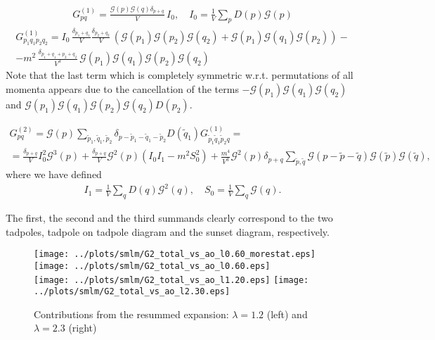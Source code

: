 \documentclass[twocolumn,showpacs,preprintnumbers,superscriptaddress,amsmath,floatfix,amssymb,secnumarabic]{revtex4}
\newcommand{\lr}[1]{ \left( #1 \right) }
\begin{document}
\begin{widetext}
\begin{eqnarray}
\label{G2_1}
 G^{\lr{1}}_{pq} = \frac{\mathcal{G}\lr{p} \mathcal{G}\lr{q} \delta_{p+q}}{V} \, I_0 ,
 \quad
 I_0 = \frac{1}{V} \sum\limits_p D\lr{p} \mathcal{G}\lr{p}
\end{eqnarray}
\begin{eqnarray}
\label{G4_1}
 G^{\lr{1}}_{p_1 q_1 p_2 q_2}
 =
 I_0 \,
 \frac{\delta_{p_1 + q_1}}{V}
 \frac{\delta_{p_2 + q_2}}{V} \,
 \lr{
  \mathcal{G}\lr{p_1} \mathcal{G}\lr{p_2} \mathcal{G}\lr{q_2}
  +
  \mathcal{G}\lr{p_1} \mathcal{G}\lr{q_1} \mathcal{G}\lr{p_2}
 }
 - \nonumber \\ -
 m^2 \,
 \frac{\delta_{p_1 + q_1 + p_2 + q_2}}{V^3} \,
 \mathcal{G}\lr{p_1} \mathcal{G}\lr{q_1} \mathcal{G}\lr{p_2} \mathcal{G}\lr{q_2}
\end{eqnarray}
Note that the last term which is completely symmetric w.r.t. permutations of all momenta appears
due to the cancellation of the terms $-\mathcal{G}\lr{p_1} \mathcal{G}\lr{q_1} \mathcal{G}\lr{q_2}$ and $\mathcal{G}\lr{p_1} \mathcal{G}\lr{q_1} \mathcal{G}\lr{p_2} \mathcal{G}\lr{q_2} D\lr{p_2}$.

\begin{eqnarray}
\label{G2_2}
 G^{\lr{2}}_{pq}
 =
 \mathcal{G}\lr{p}
 \sum\limits_{\tilde{p}_1, \tilde{q}_1, \tilde{p}_2 }
 \delta_{p - \tilde{p}_1 - \tilde{q}_1 - \tilde{p}_2}
 D\lr{\tilde{q}_1}
 G^{\lr{1}}_{\tilde{p}_1 \tilde{q}_1 \tilde{p}_2 q}
 = \nonumber \\ =
 \frac{\delta_{p+q}}{V} I_0^2 \mathcal{G}^3\lr{p}
 +
 \frac{\delta_{p+q}}{V} \mathcal{G}^2\lr{p} \lr{I_0 I_1 - m^2 S_0^2}
 +
 \frac{m^4}{V^3} \mathcal{G}^2\lr{p} \delta_{p+q}
 \sum\limits_{\tilde{p}, \tilde{q}}
 \mathcal{G}\lr{p - \tilde{p} - \tilde{q}}
 \mathcal{G}\lr{\tilde{p}}
 \mathcal{G}\lr{\tilde{q}} ,
\end{eqnarray}
where we have defined
\begin{eqnarray}
\label{scalar_ints_def}
 I_1 = \frac{1}{V} \sum\limits_q D\lr{q} \mathcal{G}^2\lr{q},
 \quad
 S_0 = \frac{1}{V} \sum\limits_q \mathcal{G}\lr{q} .
\end{eqnarray}

The first, the second and the third summands clearly correspond to the two tadpoles, tadpole on tadpole diagram and the sunset diagram, respectively.
\end{widetext}

\begin{figure*}
  \centering
  \texttt{[image: ../plots/smlm/G2\_total\_vs\_ao\_l0.60\_morestat.eps]}
  \texttt{[image: ../plots/smlm/G2\_total\_vs\_ao\_l0.60.eps]}\\
  \texttt{[image: ../plots/smlm/G2\_total\_vs\_ao\_l1.20.eps]}
  \texttt{[image: ../plots/smlm/G2\_total\_vs\_ao\_l2.30.eps]}\\
  \caption{Contributions from the resummed expansion: $\lambda = 1.2$ (left) and $\lambda = 2.3$ (right)}
  \label{fig:contribs}
\end{figure*}
\end{document}
